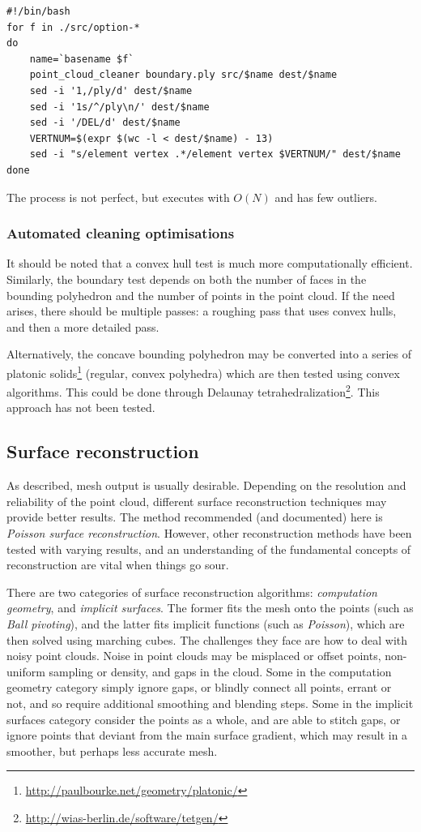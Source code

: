 \begin{lstlisting}
#!/bin/bash
for f in ./src/option-*
do
    name=`basename $f`
    point_cloud_cleaner boundary.ply src/$name dest/$name
    sed -i '1,/ply/d' dest/$name
    sed -i '1s/^/ply\n/' dest/$name
    sed -i '/DEL/d' dest/$name
    VERTNUM=$(expr $(wc -l < dest/$name) - 13)
    sed -i "s/element vertex .*/element vertex $VERTNUM/" dest/$name
done
\end{lstlisting}

The process is not perfect, but executes with $O(N)$ and has few outliers.

\subsubsection{Automated cleaning optimisations}

It should be noted that a convex hull test is much more computationally efficient. Similarly, the boundary test depends on both the number of faces in the bounding polyhedron and the number of points in the point cloud. If the need arises, there should be multiple passes: a roughing pass that uses convex hulls, and then a more detailed pass.

Alternatively, the concave bounding polyhedron may be converted into a series of platonic solids\footnote{\url{http://paulbourke.net/geometry/platonic/}} (regular, convex polyhedra) which are then tested using convex algorithms. This could be done through Delaunay tetrahedralization\footnote{\url{http://wias-berlin.de/software/tetgen/}}. This approach has not been tested.

\subsection{Surface reconstruction}
As described, mesh output is usually desirable. Depending on the resolution and reliability of the point cloud, different surface reconstruction techniques may provide better results. The method recommended (and documented) here is \emph{Poisson surface reconstruction}. However, other reconstruction methods have been tested with varying results, and an understanding of the fundamental concepts of reconstruction are vital when things go sour.

There are two categories of surface reconstruction algorithms: \emph{computation geometry}, and \emph{implicit surfaces}. The former fits the mesh onto the points (such as \emph{Ball pivoting}), and the latter fits implicit functions (such as \emph{Poisson}), which are then solved using marching cubes. The challenges they face are how to deal with noisy point clouds. Noise in point clouds may be misplaced or offset points, non-uniform sampling or density, and gaps in the cloud. Some in the computation geometry category simply ignore gaps, or blindly connect all points, errant or not, and so require additional smoothing and blending steps. Some in the implicit surfaces category consider the points as a whole, and are able to stitch gaps, or ignore points that deviant from the main surface gradient, which may result in a smoother, but perhaps less accurate mesh.

